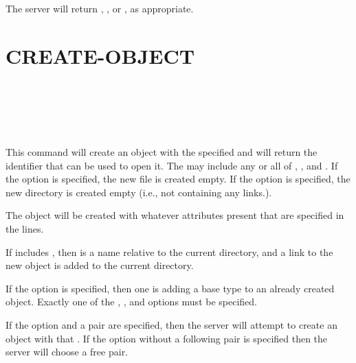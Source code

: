 The server will return , , or
, as appropriate.

\section{CREATE-OBJECT}

\begin{command}
  \commandsize \ors{}  
		\zoos{} \zooe \\ 
	\metaor {} 
		\zoos{} \zooe \\ 
	\metaor {} 
		\ore {} \\
	\zoms{}
	\zome \\
	\zoms{} \zome
\end{command}

This command will create an object with the specified
 and will 
return the identifier that can be used to open it.   The
 may include any or all of 
, , and .
If the  option is specified, the new file is
created empty.    If the  option is specified, the
new directory is created empty (i.e., not containing any links.).  

The object will be created with whatever attributes present that are
specified in the  lines.

If  includes , then
 is a name relative to the current directory, and a
link to the new object is added to the current directory.

If the  option is specified, then one is adding a base type to
an already created object.   Exactly one of the ,
, and  options must be specified.

\begin{sloppypar}
If the  option and a  
 pair are specified, then the server will attempt to create an object with that
 .  If the  option
without a following pair is
specified
then the server will choose a free 
 pair.
\end{sloppypar}

